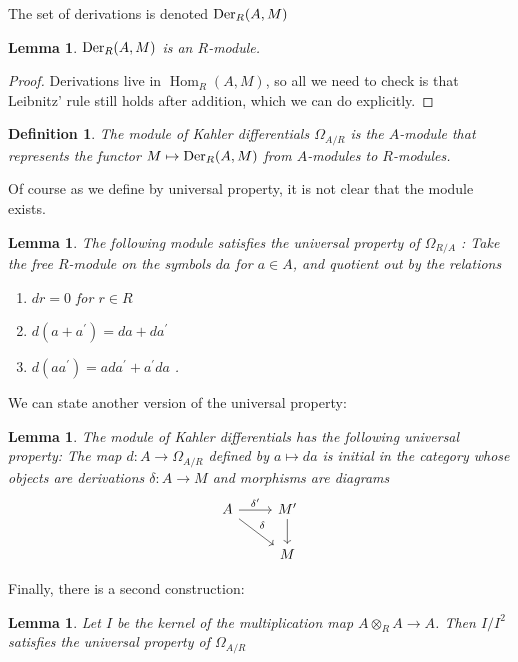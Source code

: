 \documentclass[a4paper]{article}
\newtheorem{lem}[thm]{Lemma}
\newtheorem{defn}[thm]{Definition}
\newcommand{\Hom}{\operatorname{Hom}}
\begin{document}
The set of derivations is denoted \(\operatorname{Der}_{R}(A,M)\)

\begin{lem}
	\(\operatorname{Der}_{R}(A,M)\) is an \(R\)-module.
\end{lem}

\begin{proof}
	Derivations live in \(\Hom_{R} (A,M)\),
	so all we need to check is that 
	Leibnitz' rule still holds after addition,
	which we can do explicitly.
\end{proof}

\begin{defn}
	The \textit{module of Kahler differentials}
	\(\Omega_{A / R}\) is the \(A\)-module that represents
	the functor \(M \mapsto \operatorname{Der}_{R}(A,M)\) 
	from \(A\)-modules to \(R\)-modules.
\end{defn}

Of course as we define by universal property,
it is not clear that the module exists.

\begin{lem}
	The following module satisfies the universal property 
	of \(\Omega_{R / A}\) :
	Take the free \(R\)-module on the symbols 
	\(da\) for \(a \in A\), and quotient
	out by the relations
	\begin{enumerate}[(1)]
		\item \(dr = 0\) for \(r \in R\) 
		\item \(d(a + a^{\prime}) = da + da^{\prime}\)
		\item \(d(aa^{\prime}) = 
			ada^{\prime} + a^{\prime}da\)
	.\end{enumerate}
\end{lem}

We can state another version of the universal property:

\begin{lem}
	The module of Kahler differentials has the following
	universal property: 
	The map \(d : A \to \Omega_{A / R}\) 
	defined by \(a \mapsto da\)
	is initial in
	the category whose objects are 
	derivations \(\delta : A \to M\) and
	morphisms are diagrams
	\[
	\begin{tikzcd}
	A \arrow{r}{\delta^{\prime}} \arrow{rd}{\delta} & 
	M^{\prime} \arrow{d}{} \\
	& M
	\end{tikzcd}
	\]
\end{lem}

Finally, there is a second construction:
\begin{lem}
	Let \(I\) be the kernel of the multiplication
	map \(A \otimes_{R} A \to A\).
	Then \(I / I^{2}\) 
	satisfies the universal property of \(\Omega_{A / R}\)
\end{lem}
\end{document}
